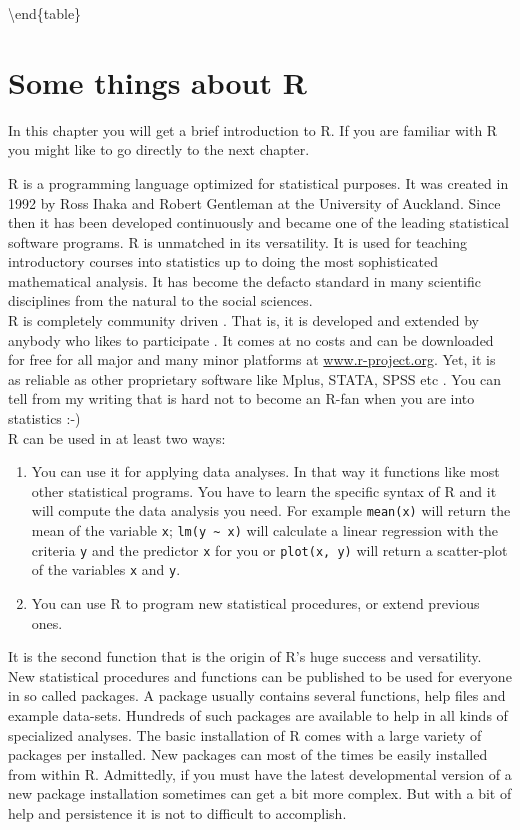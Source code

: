\documentclass[
]{book}
\providecommand{\tightlist}{%
  \setlength{\itemsep}{0pt}\setlength{\parskip}{0pt}}
\begin{document}
\textbackslash end\{table\}

\hypertarget{some-things-about-r}{%
\chapter{Some things about R}\label{some-things-about-r}}

In this chapter you will get a brief introduction to R. If you are familiar with R you might like to go directly to the next chapter.

\hfill\break
R is a programming language optimized for statistical purposes. It was created in 1992 by Ross Ihaka and Robert Gentleman at the University of Auckland. Since then it has been developed continuously and became one of the leading statistical software programs. R is unmatched in its versatility. It is used for teaching introductory courses into statistics up to doing the most sophisticated mathematical analysis. It has become the defacto standard in many scientific disciplines from the natural to the social sciences.\\
R is completely community driven . That is, it is developed and extended by anybody who likes to participate . It comes at no costs and can be downloaded for free for all major and many minor platforms at \href{http://www.r-project.org}{www.r-project.org}. Yet, it is as reliable as other proprietary software like Mplus, STATA, SPSS etc . You can tell from my writing that is hard not to become an R-fan when you are into statistics :-)\\
R can be used in at least two ways:

\begin{enumerate}
\def\labelenumi{\arabic{enumi}.}
\tightlist
\item
  You can use it for applying data analyses. In that way it functions like most other statistical programs. You have to learn the specific syntax of R and it will compute the data analysis you need. For example \texttt{mean(x)} will return the mean of the variable \texttt{x}; \texttt{lm(y\ \textasciitilde{}\ x)} will calculate a linear regression with the criteria \texttt{y} and the predictor \texttt{x} for you or \texttt{plot(x,\ y)} will return a scatter-plot of the variables \texttt{x} and \texttt{y}.
\item
  You can use R to program new statistical procedures, or extend previous ones.
\end{enumerate}

It is the second function that is the origin of R's huge success and versatility. New statistical procedures and functions can be published to be used for everyone in so called packages. A package usually contains several functions, help files and example data-sets. Hundreds of such packages are available to help in all kinds of specialized analyses. The basic installation of R comes with a large variety of packages per installed. New packages can most of the times be easily installed from within R. Admittedly, if you must have the latest developmental version of a new package installation sometimes can get a bit more complex. But with a bit of help and persistence it is not to difficult to accomplish.
\end{document}
